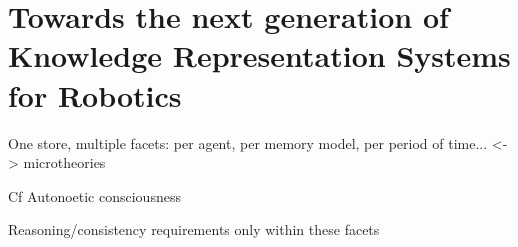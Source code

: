 \section{Towards the next generation of Knowledge Representation Systems for Robotics}
\label{sect|perspectives}


One store, multiple facets: per agent, per memory model, per period of time... <-> microtheories

Cf Autonoetic consciousness

Reasoning/consistency requirements only within these facets
